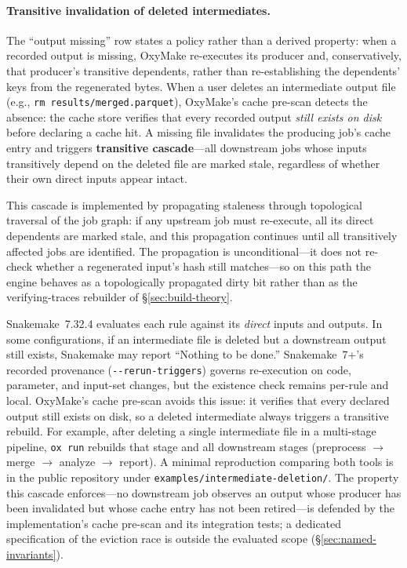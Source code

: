 \documentclass[12pt,a4paper]{article}
\newcommand{\code}[1]{{\texttt{\small\color{inlinecode}#1}}}
\begin{document}
\paragraph{Transitive invalidation of deleted intermediates.}
The ``output missing'' row states a policy rather than a derived
property: when a recorded output is missing, OxyMake re-executes its
producer and, conservatively, that producer's transitive dependents,
rather than re-establishing the dependents' keys from the regenerated
bytes. When a user deletes an intermediate output
file (e.g., \code{rm results/merged.parquet}), OxyMake's cache pre-scan
detects the absence: the cache store verifies that every recorded output
\emph{still exists on disk} before declaring a cache hit. A missing file
invalidates the producing job's cache entry and triggers \textbf{transitive
cascade}---all downstream jobs whose inputs transitively depend on the
deleted file are marked stale, regardless of whether their own direct
inputs appear intact.

This cascade is implemented by propagating staleness through topological
traversal of the job graph: if any upstream job must re-execute, all its
direct dependents are marked stale, and this propagation continues until
all transitively affected jobs are identified. The propagation is
unconditional---it does not re-check whether a regenerated input's hash
still matches---so on this path the engine behaves as a topologically
propagated dirty bit rather than as the verifying-traces rebuilder of
\S\ref{sec:build-theory}.

Snakemake~7.32.4 evaluates each rule against its \emph{direct}
inputs and outputs. In some configurations, if an intermediate
file is deleted but a downstream output still exists,
Snakemake may report ``Nothing to be done.'' Snakemake~7+'s recorded
provenance (\texttt{-{}-rerun-triggers}) governs re-execution on code,
parameter, and input-set changes, but the existence check remains
per-rule and local.
OxyMake's cache pre-scan avoids this issue: it verifies that
every declared output still exists on disk, so a deleted intermediate
always triggers a transitive rebuild. For example, after deleting a
single intermediate file in a multi-stage pipeline, \code{ox run} rebuilds
that stage and all downstream stages (preprocess $\to$ merge
$\to$ analyze $\to$ report). A minimal reproduction comparing both
tools is in the public repository under
\code{examples/\allowbreak intermediate-deletion/}.
The property this cascade enforces---no downstream job observes an
output whose producer has been invalidated but whose cache entry has
not been retired---is defended by the implementation's cache pre-scan
and its integration tests; a dedicated specification of the eviction
race is outside the evaluated scope
(\S\ref{sec:named-invariants}).
\end{document}
